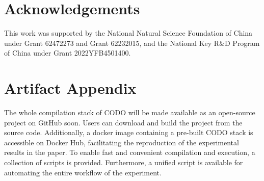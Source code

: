 \documentclass[conference]{IEEEtran}
\begin{document}
\section*{Acknowledgements}
This work was supported by the National Natural Science Foundation of China under Grant 62472273 and Grant 62232015, and the National Key R\&D Program of China under Grant 2022YFB4501400.
\clearpage
\section*{Artifact Appendix}
The whole compilation stack of CODO will be made available as an open-source project on GitHub soon. Users can download and build the project from the source code. Additionally, a docker image containing a pre-built CODO stack is accessible on Docker Hub, facilitating the reproduction of the experimental results in the paper. To enable fast and convenient compilation and execution, a collection of scripts is provided. Furthermore, a unified script is available for automating the entire workflow of the experiment.
\end{document}
